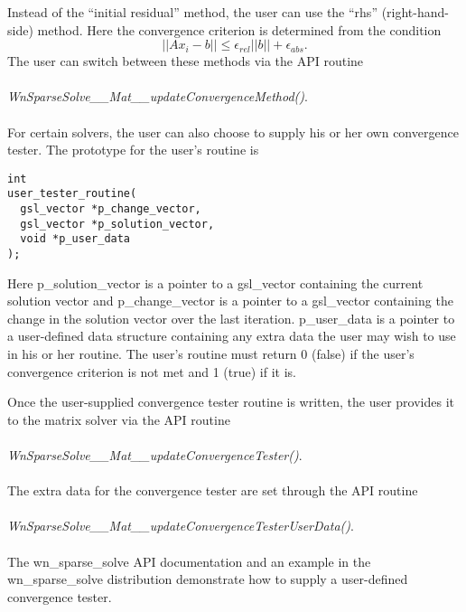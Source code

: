 \documentclass{article}    %
\begin{document}
Instead of the ``initial residual'' method, the user can use the ``rhs''
(right-hand-side) method.  Here the convergence criterion is determined
from the condition
\begin{equation}
|| Ax_{i} - b || \leq \epsilon_{rel}|| b || + \epsilon_{abs}.
\label{eq:rhs_convergence}
\end{equation}
The user can switch between these methods via the API routine
\\ \\
{\em WnSparseSolve\_\_Mat\_\_updateConvergenceMethod()}.
\\ \\ 

For certain solvers, the user can also choose to supply his or her own
convergence tester.  The prototype for the user's routine is
\begin{verbatim}
int
user_tester_routine(
  gsl_vector *p_change_vector,
  gsl_vector *p_solution_vector,
  void *p_user_data
);
\end{verbatim}
Here p\_solution\_vector is a pointer to a
gsl\_vector containing the current solution
vector and p\_change\_vector is a pointer to a gsl\_vector containing
the change in the solution vector over the last iteration.  p\_user\_data
is a pointer to a user-defined data structure containing any extra data
the user may wish to use in his or her routine.  The user's routine
must return 0 (false) if the user's convergence criterion is not met and
1 (true) if it is.

Once the user-supplied convergence tester routine is written, the user
provides it to the matrix solver via the API routine
\\ \\
{\em WnSparseSolve\_\_Mat\_\_updateConvergenceTester()}.
\\ \\
The extra data for the convergence tester are set through the API routine
\\ \\
{\em WnSparseSolve\_\_Mat\_\_updateConvergenceTesterUserData()}.
\\ \\
The wn\_sparse\_solve API documentation and an example in the wn\_sparse\_solve
distribution demonstrate how to supply a user-defined convergence tester.
  
\end{document}
